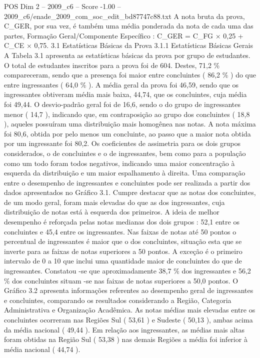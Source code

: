\begin{textsample}{POS Dim 2 – 2009\_c6 – Score -1.00 – 2009\_c6/enade\_2009\_com\_soc\_edit\_bd87747c88.txt}
A nota bruta da prova, C\_GER, por sua vez, é também uma média ponderada da nota de cada uma das partes, Formação Geral/Componente Específico : C\_GER = C\_FG × 0,25 + C\_CE × 0,75. 3.1 Estatísticas Básicas da Prova 3.1.1 Estatísticas Básicas Gerais A Tabela 3.1 apresenta as estatísticas básicas da prova por grupo de estudantes.
O total de estudantes inscritos para a prova foi de 604.
Destes, 71,2 \% compareceram, sendo que a presença foi maior entre concluintes ( 86,2 \% ) do que entre ingressantes ( 64,0 \% ).
A média geral da prova foi 46,59, sendo que os ingressantes obtiveram média mais baixa, 44,74, que os concluintes, cuja média foi 49,44.
O desvio-padrão geral foi de 16,6, sendo o do grupo de ingressantes menor ( 14,7 ), indicando que, em contraposição ao grupo dos concluintes ( 18,8 ), aqueles possuíram uma distribuição mais homogênea nas notas.
A nota máxima foi 80,6, obtida por pelo menos um concluinte, ao passo que a maior nota obtida por um ingressante foi 80,2.
Os coeficientes de assimetria para os dois grupos considerados, o de concluintes e o de ingressantes, bem como para a população como um todo foram todos negativos, indicando uma maior concentração à esquerda da distribuição e um maior espalhamento à direita.
Uma comparação entre o desempenho de ingressantes e concluintes pode ser realizada a partir dos dados apresentados no Gráfico 3.1.
Cumpre destacar que as notas dos concluintes, de um modo geral, foram mais elevadas do que as dos ingressantes, cuja distribuição de notas está à esquerda dos primeiros.
A ideia de melhor desempenho é reforçada pelas notas medianas dos dois grupos : 52,1 entre os concluintes e 45,4 entre os ingressantes.
Nas faixas de notas até 50 pontos o percentual de ingressantes é maior que o dos concluintes, situação esta que se inverte para as faixas de notas superiores a 50 pontos.
A exceção é o primeiro intervalo de 0 a 10 que inclui uma quantidade maior de concluintes do que de ingressantes.
Constatou -se que aproximadamente 38,7 \% dos ingressantes e 56,2 \% dos concluintes situam -se nas faixas de notas superiores a 50,0 pontos.
O Gráfico 3.2 apresenta informações referentes ao desempenho geral de ingressantes e concluintes, comparando os resultados considerando a Região, Categoria Administrativa e Organização Acadêmica.
As notas médias mais elevadas entre os concluintes ocorreram nas Regiões Sul ( 53,61 ) e Sudeste ( 50,13 ), ambas acima da média nacional ( 49,44 ).
Em relação aos ingressantes, as médias mais altas foram obtidas na Região Sul ( 53,38 ) nas demais Regiões a média foi inferior à média nacional ( 44,74 ).

\end{textsample}
